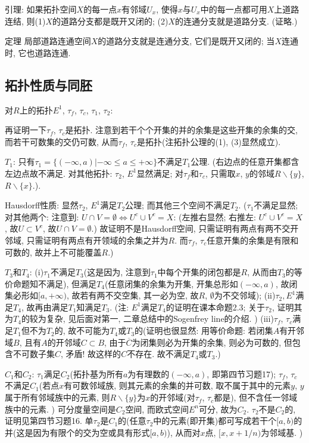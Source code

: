 \documentclass{ctexart}%
\theoremstyle{definition}
\theoremstyle{remark}
\begin{document}
引理: 如果拓扑空间$X$的每一点$x$有邻域$U_x$, 使得$x$与$U_x$中的每一点都可用$X$上道路连结, 则(1)$X$的道路分支都是既开又闭的; (2)$X$的连通分支就是道路分支. (证略.)

定理 局部道路连通空间$X$的道路分支就是连通分支, 它们是既开又闭的; 当$X$连通时, 它也道路连通. 

\subsection{拓扑性质与同胚}

对$R$上的拓扑$E^1$, $\tau_f$, $\tau_c$, $\tau_1$, $\tau_2$:

再证明一下$\tau_f$, $\tau_c$是拓扑. 注意到若干个个开集的并的余集是这些开集的余集的交, 而若干可数集的交仍可数, 从而$\tau_f$, $\tau_c$是拓扑(注拓扑公理的(1), (3)显然成立).  

$T_1$: 只有$\tau_1=\{(-\infty,a)|-\infty\leq a\leq+\infty\}$不满足$T_1$公理. (右边点的任意开集都含左边点故不满足. 对其他拓扑: $\tau_2$, $E^1$显然满足; 对$\tau_f$和$\tau_c$, 只需取$x$, $y$的邻域$R\backslash \{y\}$, $R\backslash \{x\}$.).  

Hausdorff性质: 显然$\tau_2$, $E^1$满足$T_2$公理; 而其他三个空间不满足$T_2$. ($\tau_1$不满足显然; 对其他两个: 注意到: $U\cap V=\emptyset \Longleftrightarrow U^c\cup V^c= X$: (左推右显然; 右推左: $U^c\cup V^c=X$, 故$U\subset V^c$, 故$U\cap V=\emptyset$.)  故证明不是Hausdorff空间, 只需证明有两点有两不交开邻域, 只需证明有两点有开领域的余集之并为$R$. 而$\tau_f$, $\tau_c$任意开集的余集是有限和可数的, 故并上不可能覆盖$R$.)

$T_3$和$T_4$: (i)$\tau_1$不满足$T_3$(这是因为, 注意到$\tau_1$中每个开集的闭包都是$R$, 从而由$T_3$的等价命题知不满足), 但满足$T_4$(任意闭集的余集为开集, 开集总形如$(-\infty, a)$, 故闭集必形如$[a,+\infty)$, 故若有两不交空集, 其一必为空, 故$R$, $\emptyset$为不交邻域); (ii)$\tau_2, E^1$满足$T_4$, 故再由满足$T_1$知满足$T_3$. (注: $E^1$满足$T_4$的证明在课本命题2.3; 关于$\tau_2$, 证明其为$T_4$的较为复杂, 见后面对第一, 二章总结中的Sogenfrey line的介绍. )
(iii)$\tau_f$, $\tau_c$满足$T_1$但不为$T_2$的, 故不可能为$T_4$或$T_3$的(证明也很显然: 用等价命题: 若闭集$A$有开邻域$B$, 且有$A$的开邻域$C\subset B$, 由于$\overline{C}$为闭集则必为开集的余集, 则必为可数的, 但包含不可数子集$C$, 矛盾! 故这样的$C$不存在. 故不满足$T_4$或$T_3$.) 

$C_1$和$C_2$: $\tau_1$满足$C_2$(拓扑基为所有$a$为有理数的$(-\infty, a)$, 即第四节习题17); $\tau_f$, $\tau_c$不满足$C_1$(若点$x$有可数邻域族, 则其元素的余集的并可数, 取不属于其中的元素$y$, $y$属于所有邻域族中的元素, 则$R\backslash \{y\}$为$x$的开邻域(对$\tau_f$, $\tau_c$都是), 但不含任一邻域族中的元素. ) 可分度量空间是$C_2$空间, 而欧式空间$E^n$可分, 故为$C_2$. $\tau_2$不是$C_2$的, 证明见第四节习题16. 单$\tau_2$是$C_1$的(任意$\tau_2$中的元素(即开集)都可写成若干个$[a,b)$的并(这是因为有限个的交为空或具有形式$[a,b)$), 从而对$x$点, $[x,x+1/n)$为邻域基. )
\end{document}
